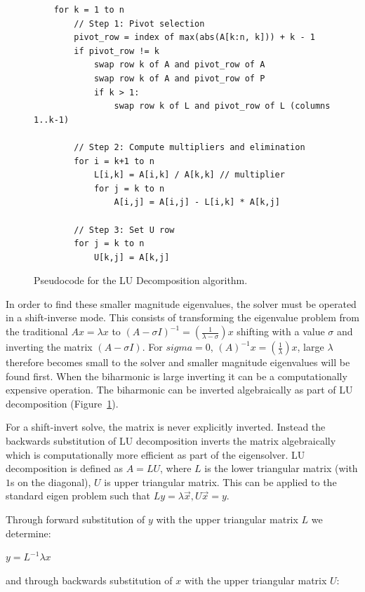 \begin{figure}
    \centering
\begin{verbatim}
    for k = 1 to n
        // Step 1: Pivot selection
        pivot_row = index of max(abs(A[k:n, k])) + k - 1
        if pivot_row != k
            swap row k of A and pivot_row of A
            swap row k of A and pivot_row of P
            if k > 1:
                swap row k of L and pivot_row of L (columns 1..k-1)

        // Step 2: Compute multipliers and elimination
        for i = k+1 to n
            L[i,k] = A[i,k] / A[k,k] // multiplier
            for j = k to n
                A[i,j] = A[i,j] - L[i,k] * A[k,j]

        // Step 3: Set U row
        for j = k to n
            U[k,j] = A[k,j]
\end{verbatim}
    \caption{Pseudocode for the LU Decomposition algorithm.}
    \label{fig:lu-decomp}
\end{figure}

In order to find these smaller magnitude eigenvalues, the solver must be operated in a shift-inverse mode. This consists of transforming the eigenvalue problem from the traditional $Ax = \lambda x$ to $(A- \sigma I)^{-1} = (\frac{1}{\lambda - \sigma})x$ shifting with a value $\sigma$ and inverting the matrix $(A - \sigma I)$. For $sigma = 0$, $(A)^{-1}x = (\frac{1}{\lambda})x$, large $\lambda$ therefore becomes small to the solver and smaller magnitude eigenvalues will be found first. When the biharmonic is large inverting it can be a computationally expensive operation. 
The biharmonic can be inverted algebraically as part of LU decomposition (Figure~\ref{fig:lu-decomp}).

For a shift-invert solve, the matrix is never explicitly inverted. Instead the backwards substitution of LU decomposition inverts the matrix algebraically which is computationally more efficient as part of the eigensolver. LU decomposition is defined as $A = LU$, where $L$ is the lower triangular matrix (with $1$s on the diagonal), $U$ is upper triangular matrix. This can be applied to the standard eigen problem such that \(Ly = \lambda \vec{x}, U\vec{x} = y\).

Through forward substitution of $y$ with the upper triangular matrix $L$ we determine: 

\(y = L^{-1} \lambda x\)

and through backwards substitution of $x$ with the upper triangular matrix $U$: 

